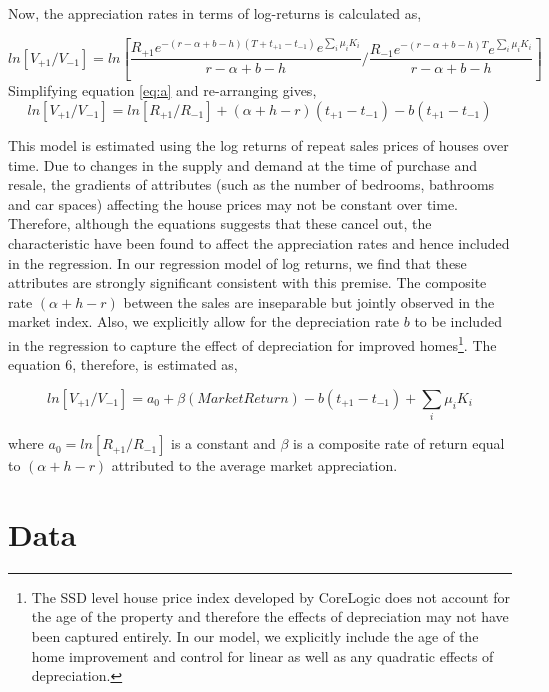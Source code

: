 \documentclass[AEJ,reqno, draftmode]{AEA} %
\begin{document}
Now, the appreciation rates in terms of log-returns is calculated as,

\begin{equation} \label{eq:a}
    ln [V_{+1}/V_{-1}] = ln [\frac{R_{+1} e^{-(r-\alpha+b-h)(T+t_{+1}-t_{-1})} e^{\sum_{i} \mu_i K_i}}{r-\alpha+b-h} / \frac{R_{-1} e^{-(r-\alpha+b-h)T} e^{\sum_{i} \mu_i K_i}}{r-\alpha+b-h}]
\end{equation}
Simplifying equation \ref{eq:a} and re-arranging gives,
\begin{equation}
    ln [V_{+1}/V_{-1}] = ln [R_{+1}/R_{-1}] + (\alpha+h-r)(t_{+1}-t_{-1}) - b(t_{+1}-t_{-1}) 
\end{equation}

This model is estimated using the log returns of repeat sales prices of houses over time. Due to changes in the supply and demand at the time of purchase and resale, the gradients of attributes (such as the number of bedrooms, bathrooms and car spaces) affecting the house prices may not be constant over time. Therefore, although the equations suggests that these cancel out, the characteristic have been found to affect the appreciation rates \citep{kiel1995effect} and hence included in the regression. In our regression model of log returns, we find that these attributes are strongly significant consistent with this premise. The composite rate $(\alpha+h-r)$ between the sales are inseparable but jointly observed in the market index. Also, we explicitly allow for the depreciation rate $b$ to be included in the regression to capture the effect of depreciation for improved homes\footnote{The SSD level house price index developed by CoreLogic does not account for the age of the property and therefore the effects of depreciation may not have been captured entirely. In our model, we explicitly include the age of the home improvement and control for linear as well as any quadratic effects of depreciation.}. The equation 6, therefore, is estimated as,

\begin{equation} \label{eq:estimate}
    ln[V_{+1}/V_{-1}] = a_0 + \beta{(Market Return)} - b(t_{+1}-t_{-1}) + \sum_{i}\mu_i K_i
\end{equation}

where $a_0 = ln[R_{+1}/R_{-1}]$ is a constant and $\beta$ is a composite rate of return equal to $(\alpha+h-r)$ attributed to the average market appreciation.


\section{Data}
\end{document}

